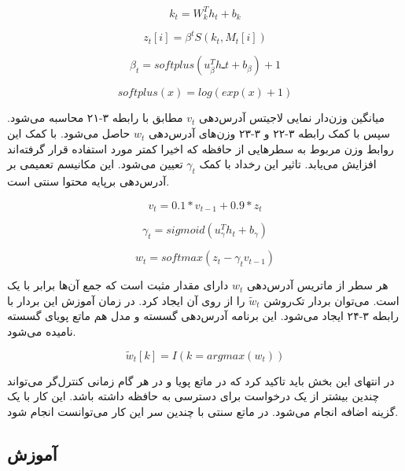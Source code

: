 \begin{equation}
k_t = W_k^Th_t + b_k
\end{equation}

\begin{equation}
z_t[i] = \beta^tS(k_t, M_t[i])
\end{equation}

\begin{equation}
\beta_t = softplus(u_{\beta}^Thـt + b_{\beta}) + 1
\end{equation}

\begin{equation}
softplus(x) = log(exp(x)+1)
\end{equation}

میانگین وزن‌دار نمایی لاجیتس آدرس‌دهی $v_t$ مطابق با رابطه ۳-۲۱ محاسبه می‌شود. سپس با کمک رابطه ۳-۲۲ و ۳-۲۳ وزن‌های آدرس‌دهی $w_t$ حاصل می‌شود. با کمک این روابط وزن مربوط به سطرهایی از حافظه که اخیرا کمتر مورد استفاده قرار گرفته‌اند افزایش می‌یابد. تاثیر این رخداد با کمک $\gamma_t$ تعیین می‌شود. این مکانیسم تعمیمی بر آدرس‌دهی برپایه محتوا سنتی است.\cite{gulcehre2018dynamic}

\begin{equation}
v_t = 0.1 * v_{t-1} + 0.9 * z_t
\end{equation}

\begin{equation}
\gamma_t = sigmoid(u_\gamma^Th_t + b_\gamma)
\end{equation}

\begin{equation}
w_t = softmax(z_t - \gamma_tv_{t-1})
\end{equation}

هر سطر از ماتریس آدرس‌دهی $w_t$ دارای مقدار مثبت است که جمع آن‌ها برابر با یک است. می‌توان بردار تک‌روشن $\tilde{w}_t$ را از روی آن ایجاد کرد. در زمان آموزش این بردار با رابطه ۳-۲۴ ایجاد می‌شود. این برنامه آدرس‌دهی گسسته و مدل هم ماتع پویای گسسته نامیده می‌شود.\cite{gulcehre2018dynamic}

\begin{equation}
\tilde{w}_t[k] = I(k=argmax(w_t))
\end{equation}

در انتهای این بخش باید تاکید کرد که در ماتع پویا و در هر گام زمانی کنترل‌گر می‌تواند چندین بیشتر از یک درخواست برای دسترسی به حافظه داشته باشد. این کار با یک گزینه اضافه انجام می‌شود. در ماتع سنتی با چندین سر این کار می‌توانست انجام شود.\cite{gulcehre2018dynamic}

\subsection{آموزش}

